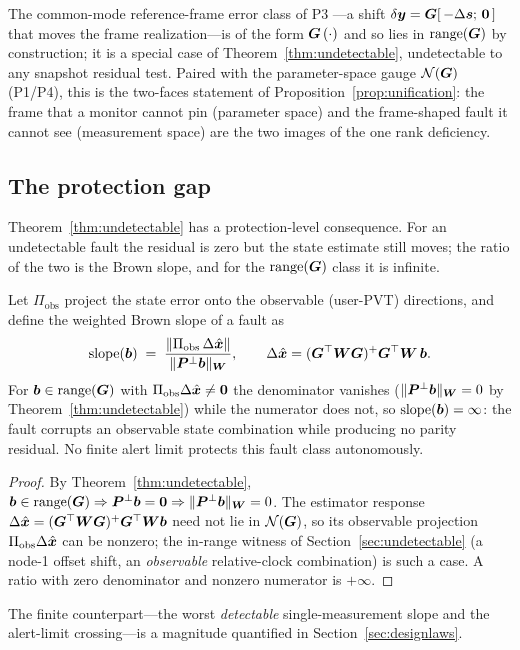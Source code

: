 \begin{remark}
\label{rem:commonmode}
The common-mode reference-frame error class of P3 \citep{baweja2026commonmode}---a shift
$\delta\bm y=\bm{G}[\,-\Delta\bm s;\,\bm 0\,]$ that moves the frame realization---is of the
form $\bm{G}\,(\cdot)$ and so lies in $\operatorname{range}(\bm{G})$ by construction; it is a special case of
Theorem~\ref{thm:undetectable}, undetectable to any snapshot residual test. Paired with the
parameter-space gauge $\mathcal{N}(\bm{G})$ (P1/P4), this is the two-faces statement of
Proposition~\ref{prop:unification}: the frame that a monitor cannot pin (parameter space)
and the frame-shaped fault it cannot see (measurement space) are the two images of the one
rank deficiency.
\end{remark}

\subsection{The protection gap}
\label{sec:protectiongap}

Theorem~\ref{thm:undetectable} has a protection-level consequence. For an undetectable fault
the residual is zero but the state estimate still moves; the ratio of the two is the Brown
slope, and for the $\operatorname{range}(\bm{G})$ class it is infinite.

\begin{proposition}
\label{prop:protection}
Let $\Pi_{\mathrm{obs}}$ project the state error onto the observable (user-PVT) directions,
and define the weighted Brown slope of a fault as
\begin{equation}
  \operatorname{slope}(\bm{b})
  \;=\;\frac{\lVert\Pi_{\mathrm{obs}}\,\Delta\hat{\bm{x}}\rVert}{\lVert\bm{P}^{\perp}\bm{b}\rVert_{\bm{W}}},
  \qquad
  \Delta\hat{\bm{x}}=(\bm{G}^\top\bm{W}\bm{G})^{+}\bm{G}^\top\bm{W}\,\bm{b} .
  \label{eq:slope}
\end{equation}
For $\bm{b}\in\operatorname{range}(\bm{G})$ with $\Pi_{\mathrm{obs}}\Delta\hat{\bm{x}}\neq\bm0$ the denominator
vanishes ($\lVert\bm{P}^{\perp}\bm{b}\rVert_{\bm{W}}=0$ by Theorem~\ref{thm:undetectable}) while the
numerator does not, so $\operatorname{slope}(\bm{b})=\infty$: the fault corrupts an observable
state combination while producing no parity residual. No finite alert limit protects this
fault class autonomously.
\end{proposition}

\begin{proof}
By Theorem~\ref{thm:undetectable}, $\bm{b}\in\operatorname{range}(\bm{G})\Rightarrow\bm{P}^{\perp}\bm{b}=\bm0\Rightarrow
\lVert\bm{P}^{\perp}\bm{b}\rVert_{\bm{W}}=0$. The estimator response
$\Delta\hat{\bm{x}}=(\bm{G}^\top\bm{W}\bm{G})^{+}\bm{G}^\top\bm{W}\bm{b}$ need not lie in
$\mathcal{N}(\bm{G})$, so its observable projection $\Pi_{\mathrm{obs}}\Delta\hat{\bm{x}}$ can be
nonzero; the in-range witness of Section~\ref{sec:undetectable} (a node-1 offset shift, an
\emph{observable} relative-clock combination) is such a case. A ratio with zero denominator
and nonzero numerator is $+\infty$.
\end{proof}

The finite counterpart---the worst \emph{detectable} single-measurement slope and the
alert-limit crossing---is a \Modelled{} magnitude quantified in Section~\ref{sec:designlaws}.

